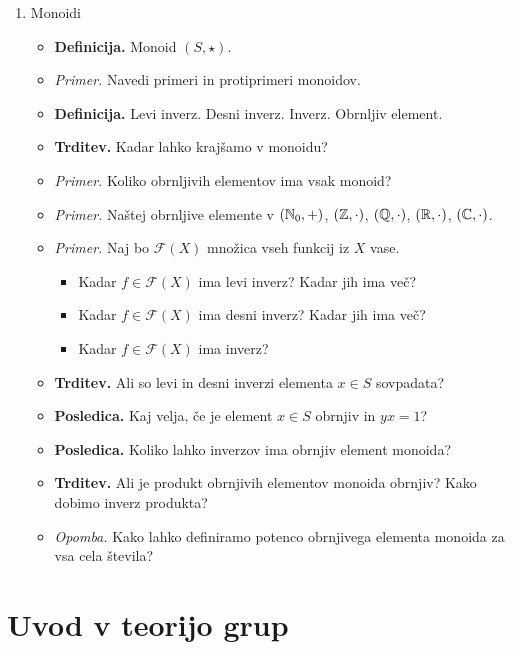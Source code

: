 \begin{enumerate}
    \item Monoidi
    \begin{itemize}
        \item \colorbox{purple!30}{\textbf{Definicija.}} Monoid $(S, \star )$.
        \item \colorbox{yellow!30}{\emph{Primer.}} Navedi primeri in protiprimeri monoidov.
        \item \colorbox{purple!30}{\textbf{Definicija.}} Levi inverz. Desni inverz. Inverz. Obrnljiv element.
        \item \colorbox{blue!30}{\textbf{Trditev.}} Kadar lahko krajšamo v monoidu?
        \item \colorbox{yellow!30}{\emph{Primer.}} Koliko obrnljivih elementov ima vsak monoid?
        \item \colorbox{yellow!30}{\emph{Primer.}} Naštej obrnljive elemente v $(\mathbb{N}_0, +)$, $(\mathbb{Z}, \cdot)$, $(\mathbb{Q}, \cdot)$, $(\mathbb{R}, \cdot)$, $(\mathbb{C}, \cdot)$.
        \item \colorbox{yellow!30}{\emph{Primer.}} Naj bo $\mathcal{F}(X)$ množica vseh funkcij iz $X$ vase.
        \begin{itemize}
            \item Kadar $f \in \mathcal{F}(X)$ ima levi inverz? Kadar jih ima več?
            \item Kadar $f \in \mathcal{F}(X)$ ima desni inverz? Kadar jih ima več? 
            \item Kadar $f \in \mathcal{F}(X)$ ima inverz?
        \end{itemize}
        \item \colorbox{blue!30}{\textbf{Trditev.}} Ali so levi in desni inverzi elementa $x \in S$ sovpadata?
        \item \colorbox{orange!30}{\textbf{Posledica.}} Kaj velja, če je element $x \in S$ obrnjiv in $yx = 1$?
        \item \colorbox{orange!30}{\textbf{Posledica.}} Koliko lahko inverzov ima obrnjiv element monoida? 
        \item \colorbox{blue!30}{\textbf{Trditev.}} Ali je produkt obrnjivih elementov monoida obrnjiv? Kako dobimo inverz produkta?
        \item \colorbox{yellow!30}{\emph{Opomba.}} Kako lahko definiramo potenco obrnjivega elementa monoida za vsa cela števila? 
    \end{itemize}
\end{enumerate}

\newpage
\section{Uvod v teorijo grup}

